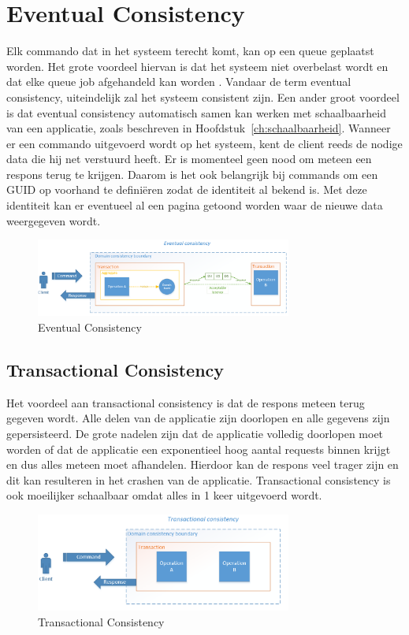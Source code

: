 
\section{Eventual Consistency}
\label{sec:eventual-consistency}

Elk commando dat in het systeem terecht komt, kan op een queue geplaatst worden. Het grote voordeel hiervan is dat het systeem niet overbelast wordt en dat elke queue job afgehandeld kan worden \autocite{King2015EventualConsistency}. Vandaar de term eventual consistency, uiteindelijk zal het systeem consistent zijn. Een ander groot voordeel is dat eventual consistency automatisch samen kan werken met schaalbaarheid van een applicatie, zoals beschreven in Hoofdstuk~\ref{ch:schaalbaarheid}. Wanneer er een commando uitgevoerd wordt op het systeem, kent de client reeds de nodige data die hij net verstuurd heeft. Er is momenteel geen nood om meteen een respons terug te krijgen.
Daarom is het ook belangrijk bij commands om een \gls{GUID} op voorhand te definiëren zodat de identiteit al bekend is. Met deze identiteit kan er eventueel al een pagina getoond worden waar de nieuwe data weergegeven wordt.

\begin{figure}[h]
\caption{Eventual Consistency}
\centering
\includegraphics[width=0.75\textwidth]{img/eventual-consistency}
\end{figure}

\subsection{Transactional Consistency}
\label{subsec:transactional-consistency}

Het voordeel aan transactional consistency is dat de respons meteen terug gegeven wordt. Alle delen van de applicatie zijn doorlopen en alle gegevens zijn gepersisteerd. De grote nadelen zijn dat de applicatie volledig doorlopen moet worden of dat de applicatie een exponentieel hoog aantal \glspl{request} binnen krijgt en dus alles meteen moet afhandelen. Hierdoor kan de respons veel trager zijn en dit kan resulteren in het crashen van de applicatie.
Transactional consistency is ook moeilijker schaalbaar omdat alles in 1 keer uitgevoerd wordt.

\begin{figure}[h]
\caption{Transactional Consistency}
\centering
\includegraphics[width=0.75\textwidth]{img/transactional-consistency}
\end{figure}
